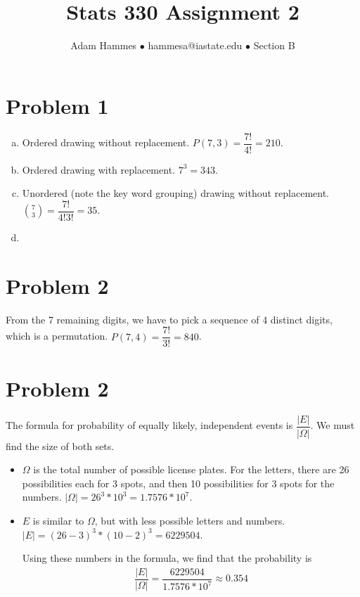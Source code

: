 \documentclass[11pt]{article}
\begin{document}
\title{Stats 330 Assignment 2}
\author{Adam Hammes $\bullet$ hammesa@iastate.edu $\bullet$ Section B}
\maketitle

\section*{Problem 1}
	\begin{enumerate}[(a)]
		\item Ordered drawing without replacement. $P( 7, 3) = \dfrac{7!}{4!} = 
		210$.
		
		\item Ordered drawing with replacement. $7^3 = 343$.
		
		\item Unordered (note the key word grouping) drawing without replacement. $\binom{7}{3} = \dfrac{7!}{4!3!} = 35$.
		
		\item 
		
	
	\end{enumerate}
	
\section*{Problem 2}

From the 7 remaining digits, we have to pick a sequence of 4 distinct digits, which is a permutation. $P(7, 4) = \dfrac{7!}{3!} = 840$.

\section*{Problem 2}

The formula for probability of equally likely, independent events is $\dfrac{|E|}{|\Omega|}$. We must find the size of both sets.
\begin{itemize}
	\item $\Omega$ is the total number of possible license plates. For the letters, 
	there are 26 possibilities each for 3 spots, and then 10 possibilities for 3 spots 
	for the numbers. $|\Omega| = 26^3 * 10^ 3 = 1.7576 * 10^7$.
	
	\item $E$ is similar to $\Omega$, but with less possible letters and numbers. $|E| = (26-3)^3 * (10-2)^3 = 6229504$.
	
Using these numbers in the formula, we find that the probability is
\begin{align*}
\dfrac{|E|}{|\Omega|} = \dfrac{6229504}{1.7576 * 10^7} \approx 0 .354
\end{align*}
\end{itemize}


 
\end{document}
